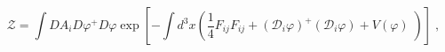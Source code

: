 \begin{equation}
\mathcal{Z=}\int DA_{i}D\varphi ^{+}D\varphi \exp \left[ -\int d^{3}x\left( 
\frac{1}{4}F_{ij}F_{ij}+\left( \mathcal{D}_{i}{\varphi }\right) ^{+}\left( 
\mathcal{D}_{i}{\varphi }\right) +V(\varphi )\;\right) \right] \;,
\label{lgs}
\end{equation}

